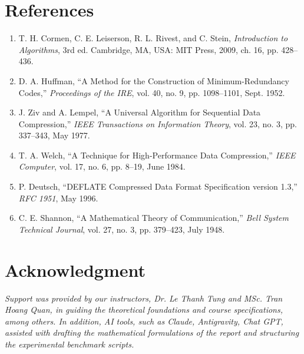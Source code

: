 \documentclass[12pt,a4paper]{article}
\begin{document}
\section{References}
\begin{enumerate}
    \item T. H. Cormen, C. E. Leiserson, R. L. Rivest, and C. Stein, \emph{Introduction to Algorithms}, 3rd ed. Cambridge, MA, USA: MIT Press, 2009, ch. 16, pp. 428--436.
    \item D. A. Huffman, ``A Method for the Construction of Minimum-Redundancy Codes,'' \emph{Proceedings of the IRE}, vol. 40, no. 9, pp. 1098--1101, Sept. 1952.
    \item J. Ziv and A. Lempel, ``A Universal Algorithm for Sequential Data Compression,'' \emph{IEEE Transactions on Information Theory}, vol. 23, no. 3, pp. 337--343, May 1977.
    \item T. A. Welch, ``A Technique for High-Performance Data Compression,'' \emph{IEEE Computer}, vol. 17, no. 6, pp. 8--19, June 1984.
    \item P. Deutsch, ``DEFLATE Compressed Data Format Specification version 1.3,'' \emph{RFC 1951}, May 1996.
    \item C. E. Shannon, ``A Mathematical Theory of Communication,'' \emph{Bell System Technical Journal}, vol. 27, no. 3, pp. 379--423, July 1948.
\end{enumerate}

\section{Acknowledgment}
\textit{Support was provided by our instructors, Dr. Le Thanh Tung and MSc. Tran Hoang Quan, in guiding the theoretical foundations and course specifications, among others. In addition, AI tools, such as Claude, Antigravity, Chat GPT, assisted with drafting the mathematical formulations of the report and structuring the experimental benchmark scripts.}
\end{document}
